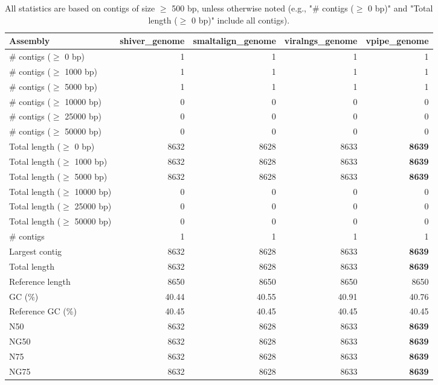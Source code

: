 \documentclass[12pt,a4paper]{article}
\begin{document}
\begin{table}[ht]
\begin{center}
\caption{All statistics are based on contigs of size $\geq$ 500 bp, unless otherwise noted (e.g., "\# contigs ($\geq$ 0 bp)" and "Total length ($\geq$ 0 bp)" include all contigs).}
\begin{tabular}{|l*{4}{|r}|}
\hline
Assembly & shiver\_genome & smaltalign\_genome & viralngs\_genome & vpipe\_genome \\ \hline
\# contigs ($\geq$ 0 bp) & 1 & 1 & 1 & 1 \\ \hline
\# contigs ($\geq$ 1000 bp) & 1 & 1 & 1 & 1 \\ \hline
\# contigs ($\geq$ 5000 bp) & 1 & 1 & 1 & 1 \\ \hline
\# contigs ($\geq$ 10000 bp) & 0 & 0 & 0 & 0 \\ \hline
\# contigs ($\geq$ 25000 bp) & 0 & 0 & 0 & 0 \\ \hline
\# contigs ($\geq$ 50000 bp) & 0 & 0 & 0 & 0 \\ \hline
Total length ($\geq$ 0 bp) & 8632 & 8628 & 8633 & {\bf 8639} \\ \hline
Total length ($\geq$ 1000 bp) & 8632 & 8628 & 8633 & {\bf 8639} \\ \hline
Total length ($\geq$ 5000 bp) & 8632 & 8628 & 8633 & {\bf 8639} \\ \hline
Total length ($\geq$ 10000 bp) & 0 & 0 & 0 & 0 \\ \hline
Total length ($\geq$ 25000 bp) & 0 & 0 & 0 & 0 \\ \hline
Total length ($\geq$ 50000 bp) & 0 & 0 & 0 & 0 \\ \hline
\# contigs & 1 & 1 & 1 & 1 \\ \hline
Largest contig & 8632 & 8628 & 8633 & {\bf 8639} \\ \hline
Total length & 8632 & 8628 & 8633 & {\bf 8639} \\ \hline
Reference length & 8650 & 8650 & 8650 & 8650 \\ \hline
GC (\%) & 40.44 & 40.55 & 40.91 & 40.76 \\ \hline
Reference GC (\%) & 40.45 & 40.45 & 40.45 & 40.45 \\ \hline
N50 & 8632 & 8628 & 8633 & {\bf 8639} \\ \hline
NG50 & 8632 & 8628 & 8633 & {\bf 8639} \\ \hline
N75 & 8632 & 8628 & 8633 & {\bf 8639} \\ \hline
NG75 & 8632 & 8628 & 8633 & {\bf 8639} \\ \hline

\end{tabular}
\end{center}
\end{table}
\end{document}
